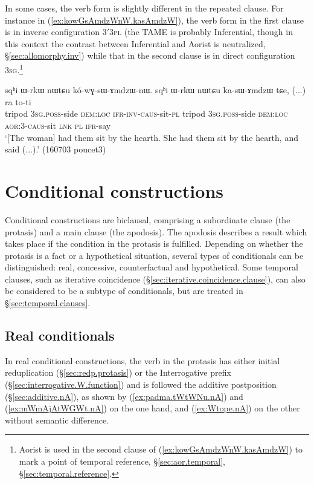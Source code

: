In some cases, the verb form is slightly different in the repeated clause. For instance in (\ref{ex:kowGsAmdzWnW.kasAmdzW}), the verb form in the first clause is in inverse configuration 3$'$\fl{}\textsc{3pl} (the TAME is probably Inferential, though in this context the contrast between Inferential and Aorist is neutralized, §\ref{sec:allomorphy.inv}) while that in the second clause is in direct configuration \textsc{3sg}\flobv{}.\footnote{Aorist is used in the second clause of (\ref{ex:kowGsAmdzWnW.kasAmdzW}) to mark a point of temporal reference, §\ref{sec:aor.temporal}, §\ref{sec:temporal.reference}.}

\begin{exe}
\ex \label{ex:kowGsAmdzWnW.kasAmdzW}
\gll sqʰi ɯ-rkɯ nɯtɕu kó-wɣ-sɯ-ɤmdzɯ-nɯ. sqʰi ɯ-rkɯ nɯtɕu ka-sɯ-ɤmdzɯ tɕe, (...) ra to-ti \\
tripod \textsc{3sg}.\textsc{poss}-side \textsc{dem}:\textsc{loc} \textsc{ifr}-\textsc{inv}-\textsc{caus}-sit-\textsc{pl} tripod \textsc{3sg}.\textsc{poss}-side \textsc{dem}:\textsc{loc} \textsc{aor}:3\flobv{}-\textsc{caus}-sit \textsc{lnk} { } \textsc{pl} \textsc{ifr}-say \\
\glt `[The woman] had them sit by the hearth. She had them sit by the hearth, and said (...).' (160703 poucet3)
\end{exe}

\section{Conditional constructions} \label{sec:conditionals}
Conditional constructions are biclausal, comprising a subordinate clause (the protasis) and a main clause (the apodosis). The apodosis describes a result which takes place if the condition in the protasis is fulfilled. Depending on whether the protasis is a fact or a hypothetical situation, several types of conditionals can be distinguished: real, concessive, counterfactual and hypothetical. Some temporal clauses, such as iterative coincidence (§\ref{sec:iterative.coincidence.clause}), can also be considered to be a subtype of conditionals, but are treated in §\ref{sec:temporal.clauses}.

\subsection{Real conditionals} \label{sec:real.conditional}
In real conditional constructions, the verb in the protasis has either initial reduplication (§\ref{sec:redp.protasis}) or the Interrogative  prefix (§\ref{sec:interrogative.W.function}) and is followed the additive postposition  (§\ref{sec:additive.nA}),  as shown by (\ref{ex:padma.tWtWNu.nA}) and (\ref{ex:mWmAjAtWGWt.nA}) on the one hand, and (\ref{ex:Wtope.nA}) on the other without semantic difference.

